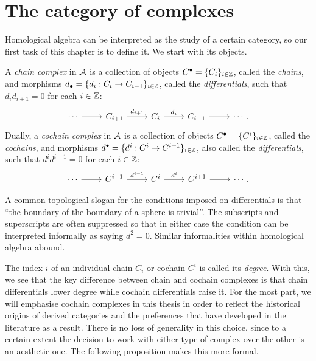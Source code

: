 \section{The category of complexes}
\label{sect_complexes}

Homological algebra can be interpreted as the study of a certain
category, so our first task of this chapter is to define it.
We start with its objects.

\begin{definition}
  \label{def_complexes}
  A \emph{chain complex} in $\mathcal{A}$ is a collection of objects
  ${{C}}^{\bullet} = \{C_i\}_{i \in \mathbb{Z}}$, called the
  \emph{chains}, and morphisms ${{d}}_{\bullet} = \{d_i: C_i \to C_{i -
  1}\}_{i \in \mathbb{Z}}$, called the \emph{differentials}, such that
  $d_i d_{i + 1} = 0$ for each $i \in \mathbb{Z}$:
  \[
    \begin{tikzcd}
      \cdots \arrow[r]
      & C_{i + 1} \arrow[r, "d_{i + 1}"]
      & C_i \arrow[r, "d_i"]
      & C_{i - 1} \arrow[r]
      & \cdots.
    \end{tikzcd}
  \]
  Dually, a \emph{cochain complex} in $\mathcal{A}$ is a collection of
  objects ${{C}}^{\bullet} = \{C^i\}_{i \in \mathbb{Z}}$, called the
  \emph{cochains}, and morphisms ${{d}}^{\bullet} = \{d^i: C^i \to
  C^{i + 1}\}_{i \in \mathbb{Z}}$, also called the \emph{differentials},
  such that $d^{i} d^{i - 1} = 0$ for each $i \in \mathbb{Z}$:
  \[
    \begin{tikzcd}
      \cdots \arrow[r]
      & C^{i - 1} \arrow[r, "d^{i - 1}"]
      & C^i \arrow[r, "d^i"]
      & C^{i + 1} \arrow[r]
      & \cdots.
    \end{tikzcd}
  \]
  \vspace{-24pt}
\end{definition}

A common topological slogan for the conditions imposed on
differentials is that ``the boundary of the boundary of a sphere is trivial''.
The subscripts and superscripts are often suppressed so that in
either case the condition can be interpreted informally as saying $d^2 = 0$.
Similar informalities within homological algebra abound.

The index $i$ of an individual chain $C_i$ or cochain $C^i$ is called
its \emph{degree}.
With this, we see that the key difference between chain and cochain
complexes is that chain differentials lower degree while cochain
differentials raise it.
For the most part, we will emphasise cochain complexes in this thesis
in order to reflect the historical origins of derived categories and
the preferences that have developed in the literature as a result.
There is no loss of generality in this choice, since to a certain
extent the decision to work with either type of complex over the
other is an aesthetic one.
The following proposition makes this more formal.

